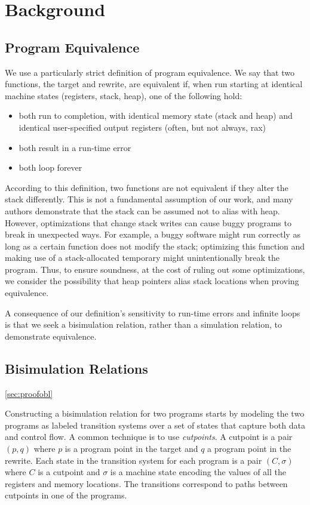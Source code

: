 \section{Background}

\subsection{Program Equivalence}

We use a particularly strict definition of program equivalence. We say
that two \arch{} functions, the target and rewrite, are equivalent
if, when run starting at identical machine states (registers, stack,
heap), one of the following hold:

\begin{itemize}
\item both run to completion, with identical memory state (stack and heap) and identical user-specified output registers (often, but not always, rax)
\item both result in a run-time error
\item both loop forever
\end{itemize}

According to this definition, two \arch{} functions are not equivalent
if they alter the stack differently. This is not a fundamental
assumption of our work, and many authors  demonstrate
that the stack can be assumed not to alias with heap. However,
optimizations that change stack writes can cause buggy programs to
break in unexpected ways. For example, a buggy software might run
correctly as long as a certain function does not modify the stack;
optimizing this function and making use of a stack-allocated temporary
might unintentionally break the program. Thus, to ensure soundness, at
the cost of ruling out some optimizations, we consider the possibility
that heap pointers alias stack locations when proving equivalence.

A consequence of our definition's sensitivity to run-time errors and
infinite loops is that we seek a bisimulation relation, rather than a
simulation relation, to demonstrate equivalence.

\subsection{Bisimulation Relations}\ref{sec:proofobl}


Constructing a bisimulation relation for two programs starts by
modeling the two programs as labeled transition systems over a set of
states that capture both data and control flow. A common technique
is to use \emph{cutpoints}. A cutpoint is a pair $(p,q)$ where $p$
is a program point in the target and $q$ a program point in the
rewrite. Each state in the transition system for each program is a
pair $(C, \sigma)$ where $C$ is a cutpoint and $\sigma$ is a machine
state encoding the values of all the registers and memory locations.
The transitions correspond to paths between cutpoints in one of the
programs.

